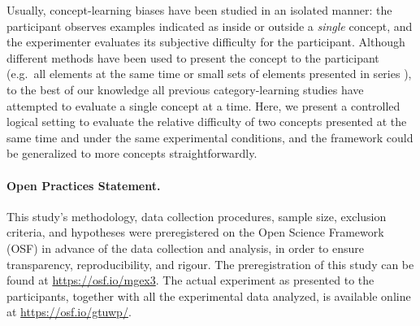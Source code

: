 Usually, concept-learning biases have been studied in an isolated manner: the participant observes examples indicated as inside or outside a \textit{single} concept, and the experimenter evaluates its subjective difficulty for the participant. Although different methods have been used to present the concept to the participant (e.g.\ all elements at the same time \cite{tano2020towards,kemp2012exploring} or small sets of elements presented in series \cite{piantadosi2016logical}), to the best of our knowledge all previous category-learning studies have attempted to evaluate a single concept at a time. Here, we present a controlled logical setting to evaluate the relative difficulty of two concepts presented at the same time and under the same experimental conditions, and the framework could be generalized to more concepts straightforwardly. 



\paragraph{Open Practices Statement.} This study's methodology, data collection procedures, sample size, exclusion criteria, and hypotheses were preregistered on the Open Science Framework (OSF) in advance of the data collection and analysis, in order to ensure transparency, reproducibility, and rigour. The preregistration of this study can be found at \url{https://osf.io/mgex3}. The actual experiment as presented to the participants, together with all the experimental data analyzed, is available online at \url{https://osf.io/gtuwp/}.


% 
%

